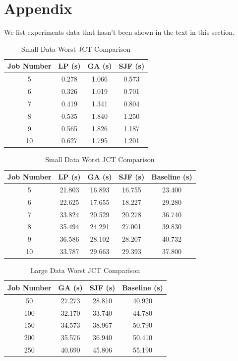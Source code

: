 \documentclass{llncs}
\begin{document}
\section*{Appendix}
We list experiments data that hasn't been shown in the text in this section.

\begin{table}[htbp]
    \centering
    \begin{minipage}[t]{0.49\textwidth}
    \centering
    \caption{Small Data Running Time Comparison}
    \begin{tabular}[width=8cm]{|c|c|c|c|}
    \hline
    Job Number  & LP (s) & GA (s) & SJF (s)  \\ \hline
    5  & 0.278 & 1.066 & 0.573 \\ \hline
    6 & 0.326 & 1.019 & 0.701 \\ \hline
    7 & 0.419 & 1.341 & 0.804 \\ \hline
    8 & 0.535 & 1.840 & 1.250 \\ \hline
    9 & 0.565 & 1.826 & 1.187 \\ \hline
    10 & 0.627 & 1.795 & 1.201 \\ \hline
    \end{tabular}
    \label{tab:smallRunTime}
    \end{minipage}
    \begin{minipage}[t]{0.49\textwidth}
    \centering
    \caption{Small Data Worst JCT Comparison}
    \begin{tabular}[width=8cm]{|c|c|c|c|c|}
    \hline
    Job Number  & LP (s) & GA (s) & SJF (s) & Baseline (s) \\ \hline
    5  & 21.803 & 16.893 & 16.755 & 23.400 \\ \hline
    6 & 22.625 & 17.655 & 18.227 & 29.280\\ \hline
    7 & 33.824 & 20.529 & 20.278 & 36.740 \\ \hline
    8 & 35.494 & 24.291 & 27.001 & 39.830 \\ \hline
    9 & 36.586 & 28.102 & 28.207 & 40.732 \\ \hline
    10 & 33.787 & 29.663 & 29.393 & 37.800 \\ \hline
    \end{tabular}
    \label{tab:smallJCT}
    \end{minipage}
\end{table}

\begin{table}[htbp]
    \centering
    \centering
    \caption{Large Data Worst JCT Comparison}
    \begin{tabular}[width=8cm]{|c|c|c|c|}
    \hline
    Job Number  & GA (s) & SJF (s) & Baseline (s) \\ \hline
    50  & 27.273 & 28.810 & 40.920 \\ \hline
    100 & 32.170 & 33.740 & 44.780 \\ \hline
    150 & 34.573 & 38.967 & 50.790  \\ \hline
    200 & 35.576 & 36.940 & 50.410 \\ \hline
    250 & 40.690 & 45.806 & 55.190 \\ \hline
    \end{tabular}
    \label{tab:largeJCT}
\end{table}
\end{document}
